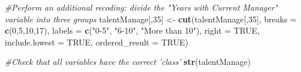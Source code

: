 \documentclass[]{article}
\newenvironment{Shaded}{\begin{snugshade}}{\end{snugshade}}
\newcommand{\KeywordTok}[1]{\textcolor[rgb]{0.13,0.29,0.53}{\textbf{{#1}}}}
\newcommand{\DataTypeTok}[1]{\textcolor[rgb]{0.13,0.29,0.53}{{#1}}}
\newcommand{\DecValTok}[1]{\textcolor[rgb]{0.00,0.00,0.81}{{#1}}}
\newcommand{\StringTok}[1]{\textcolor[rgb]{0.31,0.60,0.02}{{#1}}}
\newcommand{\CommentTok}[1]{\textcolor[rgb]{0.56,0.35,0.01}{\textit{{#1}}}}
\newcommand{\OtherTok}[1]{\textcolor[rgb]{0.56,0.35,0.01}{{#1}}}
\newcommand{\NormalTok}[1]{{#1}}
\begin{document}
\begin{Shaded}
\begin{Highlighting}[]
\CommentTok{#Perform an additional recoding: divide the "Years with Current Manager" variable into three groups}
\NormalTok{talentManage[,}\DecValTok{35}\NormalTok{] <-}\StringTok{ }\KeywordTok{cut}\NormalTok{(talentManage[,}\DecValTok{35}\NormalTok{], }\DataTypeTok{breaks =} \KeywordTok{c}\NormalTok{(}\DecValTok{0}\NormalTok{,}\DecValTok{5}\NormalTok{,}\DecValTok{10}\NormalTok{,}\DecValTok{17}\NormalTok{), }\DataTypeTok{labels =} \KeywordTok{c}\NormalTok{(}\StringTok{"0-5"}\NormalTok{, }\StringTok{"6-10"}\NormalTok{, }\StringTok{"More than 10"}\NormalTok{), }\DataTypeTok{right =} \OtherTok{TRUE}\NormalTok{, }\DataTypeTok{include.lowest =} \OtherTok{TRUE}\NormalTok{, }\DataTypeTok{ordered_result =} \OtherTok{TRUE}\NormalTok{)}

\CommentTok{#Check that all variables have the correct 'class'}
\KeywordTok{str}\NormalTok{(talentManage)}
\end{Highlighting}
\end{Shaded}
\end{document}
